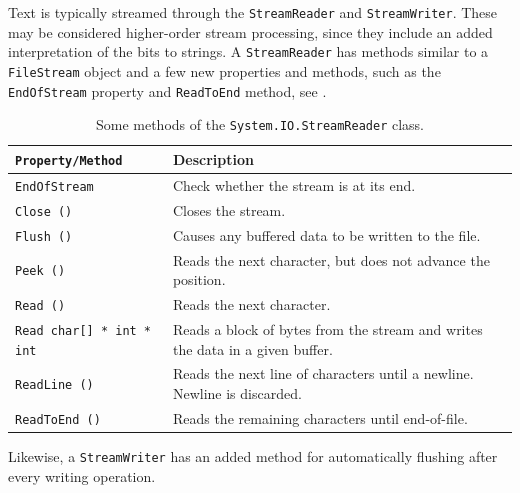 \documentclass[fsharpNotes.tex]{subfiles}
\begin{document}
%
%
Text is typically streamed through the \lstinline!StreamReader! and \lstinline!StreamWriter!. These may be considered higher-order stream processing, since they include an added interpretation of the bits to strings. A \lstinline!StreamReader! has methods similar to a \lstinline!FileStream! object and a few new properties and methods, such as the \lstinline!EndOfStream! property and \lstinline!ReadToEnd! method, see .%
%
%
%
%
%
%
%
\begin{table}
  \centering
  \begin{tabularx}{\linewidth}{|l|X|}
    \hline
    \rowcolor{headerRowColor}\lstinline{Property/Method} & Description\\
    \hline
    \lstinline{EndOfStream} & Check whether the stream is at its end.\\
    \hline
    \lstinline{Close ()} & Closes the stream.\\
    \hline
    \lstinline{Flush ()} & Causes any buffered data to be written to the file.\\
    \hline
    \lstinline{Peek ()} & Reads the next character, but does not advance the position.\\
    \hline
    \lstinline{Read ()} & Reads the next character.\\
    \hline
    \lstinline{Read char[] * int * int} & Reads a block of bytes from the stream and writes the data in a given buffer.\\
    \hline
    \lstinline{ReadLine ()} & Reads the next line of characters until a newline. Newline is discarded.\\
    \hline
    \lstinline{ReadToEnd ()} & Reads the remaining characters until end-of-file.\\
    \hline
  \end{tabularx}
  \caption{Some methods of the \lstinline!System.IO.StreamReader! class.}
  \label{tab:streamReaderMethods}
\end{table}
Likewise, a \lstinline!StreamWriter! has an added method for automatically flushing after every writing operation.%
\end{document}

